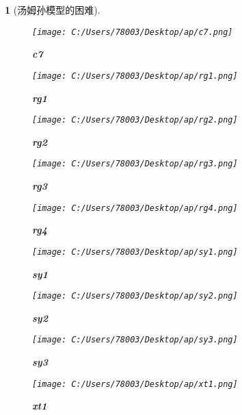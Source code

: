 \documentclass[UTF8]{report}
\theoremstyle{MyLineTheoremStyle} %
\theoremstyle{MyBlockTheoremStyle} %
\theoremstyle{MySubsubsectionStyle} %
\newtheorem{definition}{}
\begin{document}
\begin{definition}[汤姆孙模型的困难]
\begin{figure}[ht]
        \label{fig:c6}
    \end{figure}
    \begin{figure}[ht]
        \centering
        \texttt{[image: C:/Users/78003/Desktop/ap/c7.png]}
        \caption{\textbf{c7}}
        \label{fig:c7}
    \end{figure}
    \begin{figure}[ht]
        \centering
        \texttt{[image: C:/Users/78003/Desktop/ap/rg1.png]}
        \caption{\textbf{rg1}}
        \label{fig:rg1}
    \end{figure}
    \begin{figure}[ht]
        \centering
        \texttt{[image: C:/Users/78003/Desktop/ap/rg2.png]}
        \caption{\textbf{rg2}}
        \label{fig:rg2}
    \end{figure}
    \begin{figure}[ht]
        \centering
        \texttt{[image: C:/Users/78003/Desktop/ap/rg3.png]}
        \caption{\textbf{rg3}}
        \label{fig:rg3}
    \end{figure}
    \begin{figure}[ht]
        \centering
        \texttt{[image: C:/Users/78003/Desktop/ap/rg4.png]}
        \caption{\textbf{rg4}}
        \label{fig:rg4}
    \end{figure}
    \begin{figure}[ht]
        \centering
        \texttt{[image: C:/Users/78003/Desktop/ap/sy1.png]}
        \caption{\textbf{sy1}}
        \label{fig:sy1}
    \end{figure}
    \begin{figure}[ht]
        \centering
        \texttt{[image: C:/Users/78003/Desktop/ap/sy2.png]}
        \caption{\textbf{sy2}}
        \label{fig:sy2}
    \end{figure}
    \begin{figure}[ht]
        \centering
        \texttt{[image: C:/Users/78003/Desktop/ap/sy3.png]}
        \caption{\textbf{sy3}}
        \label{fig:sy3}
    \end{figure}
    \begin{figure}[ht]
        \centering
        \texttt{[image: C:/Users/78003/Desktop/ap/xt1.png]}
        \caption{\textbf{xt1}}
        \label{fig:xt1}
    \end{figure}
    \begin{figure}[ht]
        \centering

\end{figure}
\end{definition}
\end{document}
